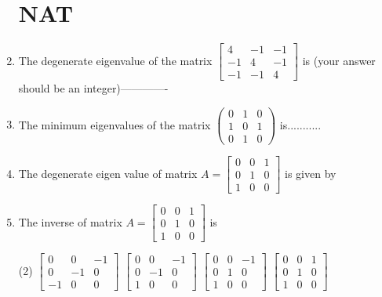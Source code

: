 \begin{enumerate}
\section{NAT}              
  \item The degenerate eigenvalue of the matrix $\left[\begin{array}{ccc}4 & -1 & -1 \\ -1 & 4 & -1 \\ -1 & -1 & 4\end{array}\right]$ is (your answer should be an integer)-------------      
\item  The minimum eigenvalues of the matrix $\left(\begin{array}{lll}0 & 1 & 0 \\ 1 & 0 & 1 \\ 0 & 1 & 0\end{array}\right)$ is...........               
  \item The degenerate eigen value of matrix $A=\left[\begin{array}{lll}0 & 0 & 1 \\ 0 & 1 & 0 \\ 1 & 0 & 0\end{array}\right]$ is given by
\item  The inverse of matrix $A=\left[\begin{array}{lll}0 & 0 & 1 \\ 0 & 1 & 0 \\ 1 & 0 & 0\end{array}\right]$ is   
 \begin{tasks}(2)
	\task[\textbf{a.}]$\left[\begin{array}{ccc}0 & 0 & -1 \\ 0 & -1 & 0 \\ -1 & 0 & 0\end{array}\right]$
	\task[\textbf{b.}]$\left[\begin{array}{ccc}0 & 0 & -1 \\ 0 & -1 & 0 \\ 1 & 0 & 0\end{array}\right]$
	\task[\textbf{c.}]$\left[\begin{array}{ccc}0 & 0 & -1 \\ 0 & 1 & 0 \\ 1 & 0 & 0\end{array}\right]$
	\task[\textbf{d.}] $\left[\begin{array}{lll}0 & 0 & 1 \\ 0 & 1 & 0 \\ 1 & 0 & 0\end{array}\right]$

\end{tasks}
\end{enumerate}
